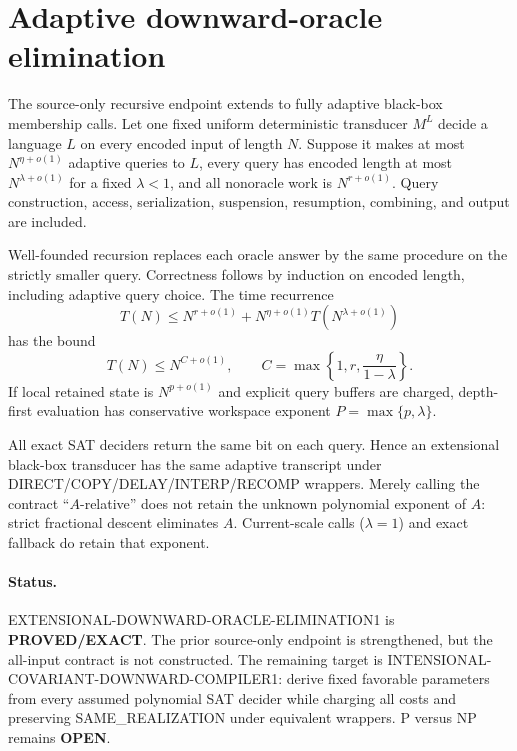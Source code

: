 \section{Adaptive downward-oracle elimination}

The source-only recursive endpoint extends to fully adaptive black-box
membership calls.  Let one fixed uniform deterministic transducer $M^L$
decide a language $L$ on every encoded input of length $N$.  Suppose it makes
at most $N^{\eta+o(1)}$ adaptive queries to $L$, every query has encoded
length at most $N^{\lambda+o(1)}$ for a fixed $\lambda<1$, and all nonoracle
work is $N^{r+o(1)}$.  Query construction, access, serialization, suspension,
resumption, combining, and output are included.

Well-founded recursion replaces each oracle answer by the same procedure on
the strictly smaller query.  Correctness follows by induction on encoded
length, including adaptive query choice.  The time recurrence
\[
 T(N)\le N^{r+o(1)}+N^{\eta+o(1)}T(N^{\lambda+o(1)})
\]
has the bound
\[
 T(N)\le N^{C+o(1)},
 \qquad C=\max\left\{1,r,\frac{\eta}{1-\lambda}\right\}.
\]
If local retained state is $N^{p+o(1)}$ and explicit query buffers are
charged, depth-first evaluation has conservative workspace exponent
$P=\max\{p,\lambda\}$.

All exact SAT deciders return the same bit on each query.  Hence an
extensional black-box transducer has the same adaptive transcript under
DIRECT/COPY/DELAY/INTERP/RECOMP wrappers.  Merely calling the contract
``$A$-relative'' does not retain the unknown polynomial exponent of $A$:
strict fractional descent eliminates $A$.  Current-scale calls
($\lambda=1$) and exact fallback do retain that exponent.

\paragraph{Status.}
EXTENSIONAL-DOWNWARD-ORACLE-ELIMINATION1 is \textbf{PROVED/EXACT}.  The prior
source-only endpoint is strengthened, but the all-input contract is not
constructed.  The remaining target is
INTENSIONAL-COVARIANT-DOWNWARD-COMPILER1: derive fixed favorable parameters
from every assumed polynomial SAT decider while charging all costs and
preserving SAME\_REALIZATION under equivalent wrappers.  P versus NP remains
\textbf{OPEN}.

